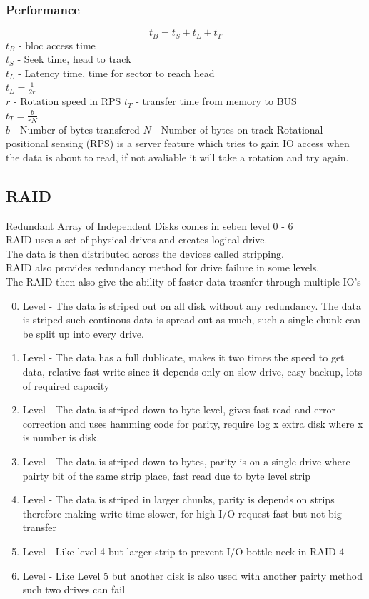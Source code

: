 \documentclass[12pt, a4paper]{article}
\begin{document}
			\subsubsection{Performance}
				$$t_B=t_S+t_L+t_T$$
				$t_B$ - bloc access time\\
				$t_S$ - Seek time, head to track\\
				$t_L$ - Latency time, time for sector to reach head\\
				$t_L=\frac{1}{2r}$ \\
				$r$ - Rotation speed in RPS
				$t_T$ - transfer time from memory to BUS\\
				$t_T=\frac{b}{rN}$\\
				$b$ - Number of bytes transfered
				$N$ - Number of bytes on track
				Rotational positional sensing (RPS) is a server feature which tries to gain IO access when the data is about to read, if not avaliable it will take a rotation and try again.\\
		\subsection{RAID}
			Redundant Array of Independent Disks comes in seben level 0 - 6\\
			RAID uses a set of physical drives and creates logical drive.\\
			The data is then distributed across the devices called stripping.\\
			RAID also provides redundancy method for drive failure in some levels.\\
			The RAID then also give the ability of faster data trasnfer through multiple IO's\\
			\begin{enumerate}
 				\setcounter{enumi}{-1}
 				\item Level - The data is striped out on all disk without any redundancy. The data is striped such continous data is spread out as much, such a single chunk can be split up into every drive.
 				\item Level - The data has a full dublicate, makes it two times the speed to get data, relative fast write since it depends only on slow drive, easy backup, lots of required capacity
 				\item Level - The data is striped down to byte level, gives fast read and error correction and uses hamming code for parity, require log x extra disk where x is number is disk.
 				\item Level - The data is striped down to bytes, parity is on a single drive where pairty bit of the same strip place, fast read due to byte level strip
 				\item Level - The data is striped in larger chunks, parity is depends on strips therefore making write time slower, for high I/O request fast but not big transfer
 				\item Level - Like level 4 but larger strip to prevent I/O bottle neck in RAID 4
 				\item Level - Like Level 5 but another disk is also used with another pairty method such two drives can fail
			\end{enumerate}
\end{document}

